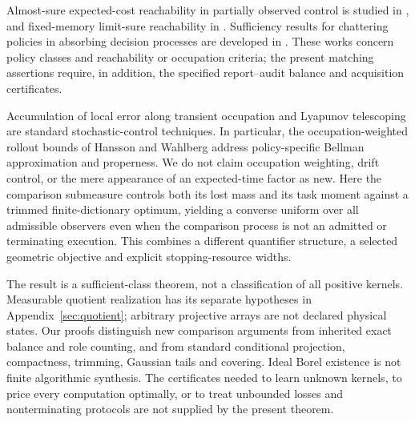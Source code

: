 Almost-sure expected-cost reachability in partially observed control is studied in \cite{CCGK}, and fixed-memory limit-sure reachability in \cite{ACSS}. Sufficiency results for chattering policies in absorbing decision processes are developed in \cite{DPChatter}. These works concern policy classes and reachability or occupation criteria; the present matching assertions require, in addition, the specified report--audit balance and acquisition certificates.


Accumulation of local error along transient occupation and Lyapunov telescoping are standard stochastic-control techniques. In particular, the occupation-weighted rollout bounds of Hansson and Wahlberg \cite{HW26} address policy-specific Bellman approximation and properness. We do not claim occupation weighting, drift control, or the mere appearance of an expected-time factor as new. Here the comparison submeasure controls both its lost mass and its task moment against a trimmed finite-dictionary optimum, yielding a converse uniform over all admissible observers even when the comparison process is not an admitted or terminating execution. This combines a different quantifier structure, a selected geometric objective and explicit stopping-resource widths.

The result is a sufficient-class theorem, not a classification of all positive kernels. Measurable quotient realization has its separate hypotheses in Appendix~\ref{sec:quotient}; arbitrary projective arrays are not declared physical states. Our proofs distinguish new comparison arguments from inherited exact balance and role counting, and from standard conditional projection, compactness, trimming, Gaussian tails and covering. Ideal Borel existence is not finite algorithmic synthesis. The certificates needed to learn unknown kernels, to price every computation optimally, or to treat unbounded losses and nonterminating protocols are not supplied by the present theorem.
